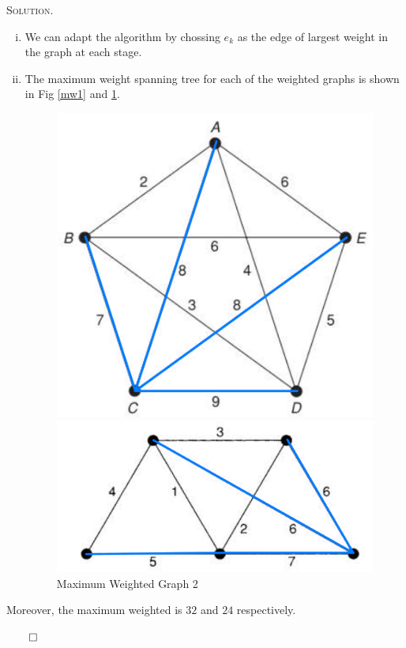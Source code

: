 \documentclass[12pt, a4paper, oneside]{ctexart}
\newenvironment{solution}{%
	\par\noindent\textsc{Solution. }\ignorespaces
}{%
	\hfill$\qed$\par
}
\begin{document}
	\begin{solution}
        \begin{enumerate}[(i)]
            \item We can adapt the algorithm by chossing $e_k$ as the edge
            of  largest weight in the graph at each stage.
            \item The maximum weight spanning tree for each of the weighted
            graphs is shown in Fig \ref{mw1} and \ref{mw2}.
            \begin{figure}[H]
                \centering
                \begin{minipage}{0.49\linewidth}
                    \centering
                    \includegraphics[width=0.7\linewidth]{figure/fig7.jpg}
                    \caption{Maximum Weighted Graph 1}
                    \label{mw1}
                \end{minipage}
                \begin{minipage}{0.49\linewidth}
                    \centering
                    \includegraphics[width=0.9\linewidth]{figure/fig8.jpg}
                    \caption{Maximum Weighted Graph 2}
                    \label{mw2}
                \end{minipage}
            \end{figure}
        \end{enumerate}
		Moreover, the maximum weighted is $32$ and $24$ respectively.

    \end{solution}
		
\end{document}
